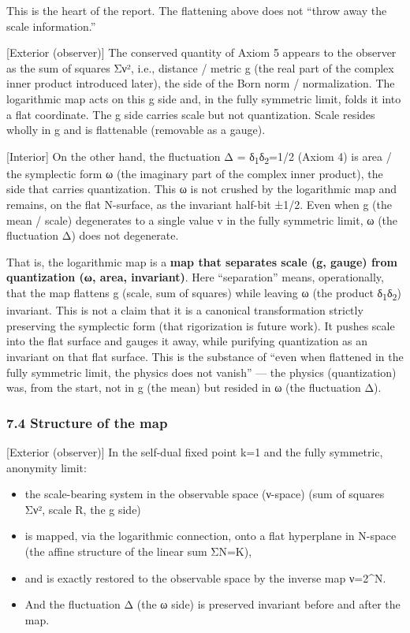 \documentclass[11pt]{ltjsarticle}
\providecommand{\tightlist}{\setlength{\itemsep}{0pt}\setlength{\parskip}{0pt}}
\begin{document}
This is the heart of the report. The flattening above does not ``throw
away the scale information.''

{[}Exterior (observer){]} The conserved quantity of Axiom 5 appears to
the observer as the sum of squares Σν², i.e., distance / metric g (the
real part of the complex inner product introduced later), the side of
the Born norm / normalization. The logarithmic map acts on this g side
and, in the fully symmetric limit, folds it into a flat coordinate. The
g side carries scale but not quantization. Scale resides wholly in g and
is flattenable (removable as a gauge).

{[}Interior{]} On the other hand, the fluctuation Δ = δ\textsubscript{1}δ\textsubscript{2}=1/2 (Axiom 4)
is area / the symplectic form ω (the imaginary part of the complex inner
product), the side that carries quantization. This ω is not crushed by
the logarithmic map and remains, on the flat N-surface, as the invariant
half-bit ±1/2. Even when g (the mean / scale) degenerates to a single
value v in the fully symmetric limit, ω (the fluctuation Δ) does not
degenerate.

That is, the logarithmic map is a \textbf{map that separates scale (g,
gauge) from quantization (ω, area, invariant)}. Here ``separation''
means, operationally, that the map flattens g (scale, sum of squares)
while leaving ω (the product δ\textsubscript{1}δ\textsubscript{2}) invariant. This is not a claim that
it is a canonical transformation strictly preserving the symplectic form
(that rigorization is future work). It pushes scale into the flat
surface and gauges it away, while purifying quantization as an invariant
on that flat surface. This is the substance of ``even when flattened in
the fully symmetric limit, the physics does not vanish'' --- the physics
(quantization) was, from the start, not in g (the mean) but resided in ω
(the fluctuation Δ).

\subsubsection{7.4 Structure of the map}\label{structure-of-the-map}

{[}Exterior (observer){]} In the self-dual fixed point k=1 and the fully
symmetric, anonymity limit:

\begin{itemize}
\tightlist
\item
  the scale-bearing system in the observable space (ν-space) (sum of
  squares Σν², scale R, the g side)
\item
  is mapped, via the logarithmic connection, onto a flat hyperplane in
  N-space (the affine structure of the linear sum ΣN=K),
\item
  and is exactly restored to the observable space by the inverse map
  ν=2\^{}N.
\item
  And the fluctuation Δ (the ω side) is preserved invariant before and
  after the map.
\end{itemize}
\end{document}
